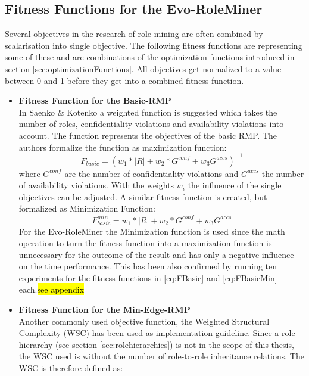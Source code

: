         \subsection{Fitness Functions for the Evo-RoleMiner}
        \label{sec:fitnessFunctions}
        Several objectives in the research of role mining are often combined by scalarisation into single objective. The following fitness functions are representing some of these and are combinations of the optimization functions introduced in section \ref{sec:optimizationFunctions}. All objectives get normalized to a value between 0 and 1 before they get into a combined fitness function.
        \begin{itemize}
            \item \textbf{Fitness Function for the Basic-RMP}\\
            In Saenko \& Kotenko\cite{saenko2012design} a weighted function is suggested which takes the number of roles, confidentiality violations and availability violations into account. The function represents the objectives of the basic RMP. The authors formalize the function as maximization function:
            \begin{equation}\label{eq:FBasic}
                F_{basic} = (w_1 * |R| + w_2 * G^{conf} + w_3 G^{accs})^{-1}
            \end{equation}    
            where $G^{conf}$ are the number of confidentiality violations and $G^{accs}$ the number of availability violations. With the weights $w_i$ the influence of the single objectives can be adjusted. A similar fitness function is created, but formalized as Minimization Function:
            \begin{equation}\label{eq:FBasicMin}
                F_{basic}^{min} = w_1 * |R| + w_2 * G^{conf} + w_3 G^{accs}
            \end{equation}
            For the Evo-RoleMiner the Minimization function is used since the math operation to turn the fitness function into a maximization function is unnecessary for the outcome of the result and has only a negative influence on the time performance. This has been also confirmed by running ten experiments for the fitness functions in \eqref{eq:FBasic} and \eqref{eq:FBasicMin} each.\hl{see appendix}
            \item \textbf{Fitness Function for the Min-Edge-RMP}\\
            Another commonly used objective function, the Weighted Structural Complexity (WSC)\cite{Molloy}\cite{Xu} has been used as implementation guideline. Since a role hierarchy (see section \ref{sec:rolehierarchies}) is not in the scope of this thesis, the WSC used is without the number of role-to-role inheritance relations. The WSC is therefore defined as:

\end{itemize}
